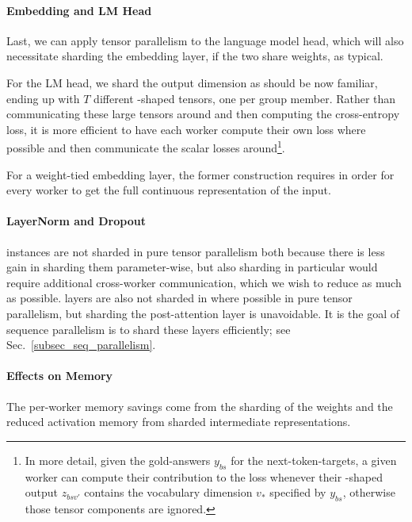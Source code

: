 \documentclass[11pt]{article}
\begin{document}
 \paragraph{Embedding and LM Head} Last, we can apply tensor parallelism to the language model head,
 which will also necessitate sharding the embedding layer, if the two share weights, as typical.

For the LM head, we shard the output dimension as should be now familiar, ending up with $ T $
different -shaped tensors, one per group member. Rather than communicating
these large tensors around and then computing the cross-entropy loss, it is more efficient to have
each worker compute their own loss where possible and then communicate the scalar losses
around\footnote{In more detail, given the gold-answers $ y _{ bs } $ for the next-token-targets, a
given worker can compute their contribution to the loss whenever their -shaped
output $ z _{ bsv' } $ contains the vocabulary dimension $ v _{ * } $ specified by $ y _{ bs } $,
otherwise those tensor components are ignored.}.

For a weight-tied embedding layer, the former construction requires  in order
for every worker to get the full continuous representation of the input.

\paragraph{LayerNorm and Dropout}  instances are not sharded in pure tensor
parallelism both because there is less gain in sharding them parameter-wise, but also sharding
 in particular would require additional cross-worker communication, which we
wish to reduce as much as possible.  layers are also not sharded in  where
possible in pure tensor parallelism, but sharding the post-attention  layer is
unavoidable. It is the goal of sequence parallelism is to shard these layers efficiently; see
Sec.~\ref{subsec_seq_parallelism}.



 \paragraph{Effects on Memory} The per-worker memory savings come from the sharding of the weights
 and the reduced activation memory from sharded intermediate representations.
\end{document}
